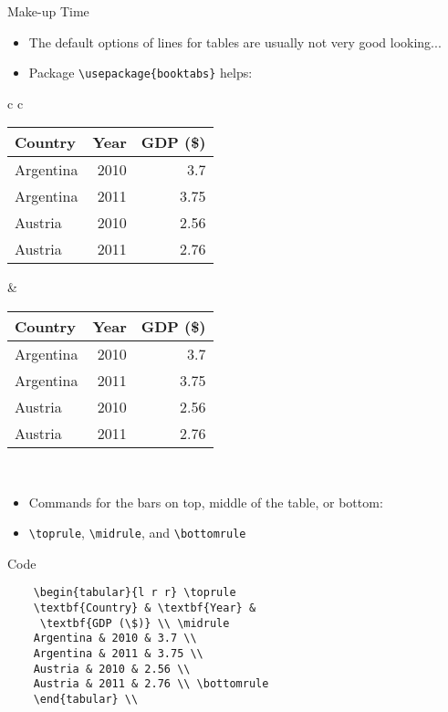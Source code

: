 \documentclass{beamer}
\begin{document}
\begin{frame}[fragile]{Make-up Time}
	\begin{itemize}
		\item The default options of lines for tables are usually not very good looking...
		\item Package \verb|\usepackage{booktabs}| helps:
			\end{itemize}
		\begin{tabular}{c c}
				\begin{tabular}{|l r r|} \hline
					\textbf{Country} & \textbf{Year} & \textbf{GDP (\$)} \\ \hline
					Argentina & 2010 & 3.7 \\
					Argentina & 2011 & 3.75 \\
					Austria & 2010 & 2.56 \\
					Austria & 2011 & 2.76 \\ \hline
			\end{tabular}
			& 
			\begin{tabular}{l r r} \toprule
				\textbf{Country} & \textbf{Year} & \textbf{GDP (\$)} \\ \midrule
				Argentina & 2010 & 3.7 \\
				Argentina & 2011 & 3.75 \\
				Austria & 2010 & 2.56 \\
				Austria & 2011 & 2.76 \\ \bottomrule
			\end{tabular} \\
		\end{tabular}
		\begin{itemize}
			\item Commands for the bars on top, middle of the table, or bottom:
			\item \verb|\toprule|, \verb|\midrule|, and \verb|\bottomrule|
		\end{itemize}
\end{frame}

\begin{frame}[fragile]{Code}
	\begin{verbatim}
	\begin{tabular}{l r r} \toprule
	\textbf{Country} & \textbf{Year} &
	 \textbf{GDP (\$)} \\ \midrule
	Argentina & 2010 & 3.7 \\
	Argentina & 2011 & 3.75 \\
	Austria & 2010 & 2.56 \\
	Austria & 2011 & 2.76 \\ \bottomrule
	\end{tabular} \\
	\end{verbatim}
\end{frame}
\end{document}
